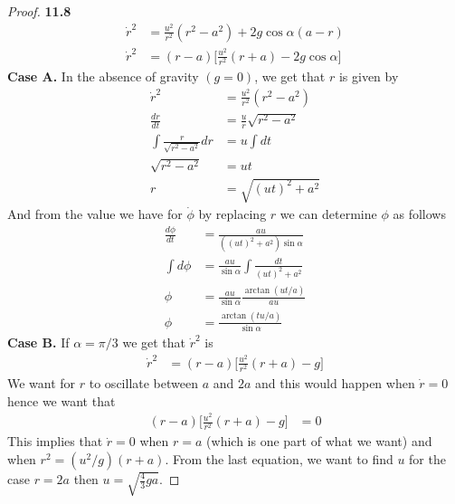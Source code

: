 \documentclass[11pt]{article}
\theoremstyle{definition}
\begin{document}
\begin{proof}{\textbf{11.8}}
\begin{align*}
        \dot{r}^2 &= \frac{u^2}{r^2}(r^2 - a^2) + 2g\cos \alpha(a - r)\\
        \dot{r}^2 &= (r - a)\bigg[\frac{u^2}{r^2}(r + a) - 2g\cos \alpha\bigg]
    \end{align*}
    \textbf{Case A.} In the absence of gravity $(g=0)$, we get that $r$
    is given by
    \begin{align*}
        \dot{r}^2 &= \frac{u^2}{r^2}(r^2 - a^2)\\
        \frac{dr}{dt} &= \frac{u}{r}\sqrt{r^2 - a^2}\\
        \int \frac{r}{\sqrt{r^2 - a^2}} dr &= u \int dt\\
        \sqrt{r^2 - a^2} &= ut\\
        r &= \sqrt{(ut)^2 + a^2}
    \end{align*}
    And from the value we have for $\dot{\phi}$ by replacing $r$ we can
    determine $\phi$ as follows
    \begin{align*}
        \frac{d\phi}{dt} &= \frac{au}{((ut)^2 + a^2) \sin \alpha}\\
        \int d\phi &= \frac{au}{\sin \alpha} \int \frac{dt}{(ut)^2 + a^2}\\
        \phi &= \frac{au}{\sin \alpha} \frac{\arctan(ut/a)}{au}\\
        \phi &= \frac{\arctan(tu/a)}{\sin \alpha}
    \end{align*}
    \textbf{Case B.} If $\alpha = \pi/3$ we get that $\dot{r}^2$ is 
    \begin{align*}
        \dot{r}^2 &= (r - a)\bigg[\frac{u^2}{r^2}(r + a) - g\bigg]
    \end{align*}
    We want for $r$ to oscillate between $a$ and $2a$ and this would happen when
    $\dot{r} = 0$ hence we want that
    \begin{align*}
        (r - a)\bigg[\frac{u^2}{r^2}(r + a) - g\bigg] &= 0
    \end{align*}
    This implies that $\dot{r} = 0$ when $r = a$ (which is one part of what
    we want) and when $r^2 = (u^2/g)(r+a)$. From the last equation, we want to
    find $u$ for the case $r = 2a$ then $u =\sqrt{\frac{4}{3}ga}$.


\end{proof}
\end{document}
